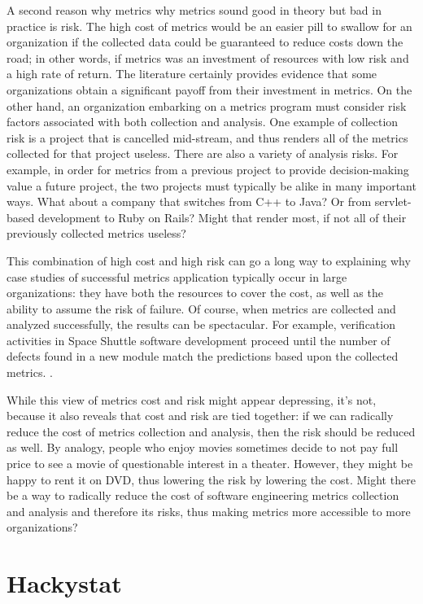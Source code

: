 \documentclass[12pt]{article}
\begin{document}
A second reason why metrics why metrics sound good in theory but bad in
practice is risk.  The high cost of metrics would be an easier pill to
swallow for an organization if the collected data could be guaranteed to
reduce costs down the road; in other words, if metrics was an investment of
resources with low risk and a high rate of return.  The literature
certainly provides evidence that some organizations obtain a significant
payoff from their investment in metrics.  On
the other hand, an organization embarking on a metrics program must
consider risk factors associated with both collection and analysis. One example
of collection risk is a project that is cancelled mid-stream, and thus
renders all of the metrics collected for that project useless.  There are
also a variety of analysis risks. For example, in order for metrics from a
previous project to provide decision-making value a future project, the two
projects must typically be alike in many important ways. What about a
company that switches from C++ to Java?  Or from servlet-based development
to Ruby on Rails? Might that render most, if not all of their previously
collected metrics useless?

This combination of high cost and high risk can go a long way to explaining
why case studies of successful metrics application typically occur in large
organizations: they have both the resources to cover the cost, as well as
the ability to assume the risk of failure.  Of course, when metrics are
collected and analyzed successfully, the results can be spectacular.  For
example, verification activities in Space Shuttle software development
proceed until the number of defects found in a new module match the
predictions based upon the collected metrics.
\cite{Fishman96}.

While this view of metrics cost and risk might appear depressing, it's not,
because it also reveals that cost and risk are tied together: if we can
radically reduce the cost of metrics collection and analysis, then the risk
should be reduced as well.  By analogy, people who enjoy movies sometimes
decide to not pay full price to see a movie of questionable interest in a
theater. However, they might be happy to rent it on DVD, thus lowering the
risk by lowering the cost.  Might there be a way to radically reduce the
cost of software engineering metrics collection and analysis and therefore
its risks, thus making metrics more accessible to more organizations?

\section{Hackystat}
\end{document}

